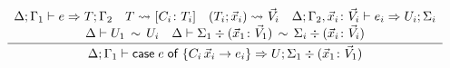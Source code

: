 \begin{figure}[t]
\begin{gather*}
{    }
  \\
  \frac{
    \begin{array}{c}
    \algtypeout[\kindEnv;\varEnv_1]{e}{T}{\varEnv_2}
    \quad
    T \Extract{}[C_i\colon T_i]
    \quad
    (T_i;\vec x_i) \Extract{}{\vec V_i}
    \quad
    \algtypeout[\kindEnv;\varEnv_2, \vec x_i\colon\vec V_i]{e_i}{U_i}{\Sigma_i}
    \\
    \typeequiv{U_1}{U_i}    
    \quad
    \ctxequiv{\Sigma_1 \div (\vec x_1\colon\vec V_1)}{\Sigma_i \div (\vec x_i\colon\vec V_i)} 
    \end{array}
  }{
    \algtypeout[\kindEnv;\varEnv_1]{\casee{e}{\{C_i\,\vec x_i\rightarrow e_i\}}}{U}{\Sigma_1 \div (\vec x_1\colon\vec V_1)}
  }
  \end{gather*}
\end{figure}



